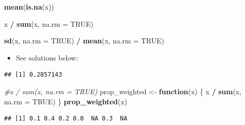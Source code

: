 \documentclass[]{book}
\newenvironment{Shaded}{\begin{snugshade}}{\end{snugshade}}
\newcommand{\CommentTok}[1]{\textcolor[rgb]{0.56,0.35,0.01}{\textit{#1}}}
\newcommand{\ControlFlowTok}[1]{\textcolor[rgb]{0.13,0.29,0.53}{\textbf{#1}}}
\newcommand{\DataTypeTok}[1]{\textcolor[rgb]{0.13,0.29,0.53}{#1}}
\newcommand{\DecValTok}[1]{\textcolor[rgb]{0.00,0.00,0.81}{#1}}
\newcommand{\KeywordTok}[1]{\textcolor[rgb]{0.13,0.29,0.53}{\textbf{#1}}}
\newcommand{\NormalTok}[1]{#1}
\newcommand{\OperatorTok}[1]{\textcolor[rgb]{0.81,0.36,0.00}{\textbf{#1}}}
\newcommand{\OtherTok}[1]{\textcolor[rgb]{0.56,0.35,0.01}{#1}}
\newcommand{\StringTok}[1]{\textcolor[rgb]{0.31,0.60,0.02}{#1}}
\providecommand{\tightlist}{%
  \setlength{\itemsep}{0pt}\setlength{\parskip}{0pt}}
\theoremstyle{definition}
\theoremstyle{definition}
\theoremstyle{definition}
\theoremstyle{remark}
\begin{document}
\begin{enumerate}
\begin{Shaded}
\begin{Highlighting}[]
\KeywordTok{mean}\NormalTok{(}\KeywordTok{is.na}\NormalTok{(x))}

\NormalTok{x }\OperatorTok{/}\StringTok{ }\KeywordTok{sum}\NormalTok{(x, }\DataTypeTok{na.rm =} \OtherTok{TRUE}\NormalTok{)}

\KeywordTok{sd}\NormalTok{(x, }\DataTypeTok{na.rm =} \OtherTok{TRUE}\NormalTok{) }\OperatorTok{/}\StringTok{ }\KeywordTok{mean}\NormalTok{(x, }\DataTypeTok{na.rm =} \OtherTok{TRUE}\NormalTok{)}
\end{Highlighting}
\end{Shaded}

  \begin{itemize}
  \tightlist
  \item
    See solutions below:
  \end{itemize}

\begin{Shaded}
\end{Shaded}

\begin{verbatim}
## [1] 0.2857143
\end{verbatim}

\begin{Shaded}
\begin{Highlighting}[]
\CommentTok{#x / sum(x, na.rm = TRUE)}
\NormalTok{prop_weighted <-}\StringTok{ }\ControlFlowTok{function}\NormalTok{(x) \{}
\NormalTok{  x }\OperatorTok{/}\StringTok{ }\KeywordTok{sum}\NormalTok{(x, }\DataTypeTok{na.rm =} \OtherTok{TRUE}\NormalTok{)}
\NormalTok{\}}
\KeywordTok{prop_weighted}\NormalTok{(x)}
\end{Highlighting}
\end{Shaded}

\begin{verbatim}
## [1] 0.1 0.4 0.2 0.0  NA 0.3  NA
\end{verbatim}


\end{enumerate}
\end{document}

